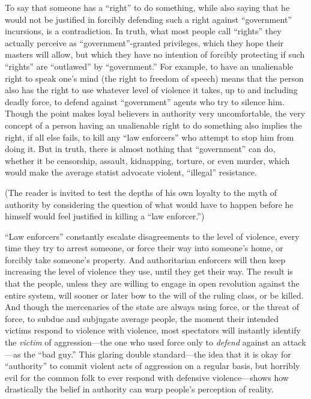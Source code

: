 \documentclass{book}
\begin{document}
To say that someone has a \enquote{right} to do something, while also saying that he would not be justified in forcibly defending such a right against \enquote{government} incursions, is a contradiction. In truth, what most people call \enquote{rights} they actually perceive as \enquote{government}-granted privileges, which they hope their masters will allow, but which they have no intention of forcibly protecting if such \enquote{rights} are \enquote{outlawed} by \enquote{government.} For example, to have an unalienable right to speak one's mind (the right to freedom of speech) means that the person also has the right to use whatever level of violence it takes, up to and including deadly force, to defend against \enquote{government} agents who try to silence him. Though the point makes loyal believers in authority very uncomfortable, the very concept of a person having an unalienable right to do something also implies the right, if all else fails, to kill any \enquote{law enforcers} who attempt to stop him from doing it. But in truth, there is almost nothing that \enquote{government} can do, whether it be censorship, assault, kidnapping, torture, or even murder, which would make the average statist advocate violent, \enquote{illegal} resistance.

(The reader is invited to test the depths of his own loyalty to the myth of authority by considering the question of what would have to happen before he himself would feel justified in killing a \enquote{law enforcer.})

\enquote{Law enforcers} constantly escalate disagreements to the level of violence, every time they try to arrest someone, or force their way into someone's home, or forcibly take someone's property. And authoritarian enforcers will then keep increasing the level of violence they use, until they get their way. The result is that the people, unless they are willing to engage in open revolution against the entire system, will sooner or later bow to the will of the ruling class, or be killed. And though the mercenaries of the state are always using force, or the threat of force, to subdue and subjugate average people, the moment their intended victims respond to violence with violence, most spectators will instantly identify the \emph{victim} of aggression---the one who used force only to \emph{defend} against an attack---as the \enquote{bad guy.} This glaring double standard---the idea that it is okay for \enquote{authority} to commit violent acts of aggression on a regular basis, but horribly evil for the common folk to ever respond with defensive violence---shows how drastically the belief in authority can warp people's perception of reality.
\end{document}
